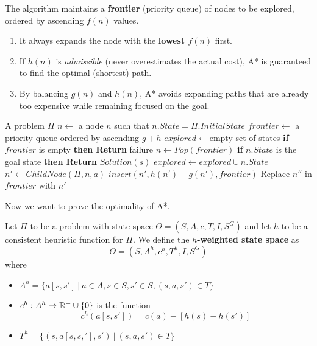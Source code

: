 \documentclass[10pt, letterpaper]{report}
\begin{document}
The algorithm maintains a \textbf{frontier} (priority queue) of nodes to be explored, ordered by ascending $f(n)$ values.
\begin{enumerate}
    \item It always expands the node with the \textbf{lowest $f(n)$} first.
    \item If $h(n)$ is \textit{admissible} (never overestimates the actual cost), A* is guaranteed to find the optimal (shortest) path.
    \item By balancing $g(n)$ and $h(n)$, A* avoids expanding paths that are already too expensive while remaining focused on the goal.
\end{enumerate}
\begin{algorithm}
    \caption{A*}\label{alg:A*}
    \begin{algorithmic}
    \Require A problem $\Pi$
    \State $n\leftarrow$ a node $n$ such that $n.State=\Pi.InitialState$
    \State $frontier\leftarrow$ a priority queue ordered by ascending $g+h$
    \State $explored\leftarrow $empty set of states
    \State \textbf{if} $frontier$ is empty \textbf{then Return} failure 
    \State $n\leftarrow Pop(frontier)$
    \State \textbf{if} $n.State$ is the goal state \textbf{then Return} $Solution(s)$
    \State $explored\leftarrow explored \cup n.State$
    \State $n'\leftarrow ChildNode(\Pi,n,a)$
    \State $insert(n',h(n')+g(n'),frontier)$ 
    \State Replace $n''$ in $frontier$ with $n'$
    \EndIf
    \EndFor
    \EndWhile
    \end{algorithmic}
\end{algorithm}
Now we want to prove the optimality of A*.
\begin{definition}
    Let $\Pi$ to be a problem with state space $\Theta=(S,A,c,T,I,S^G)$ and let $h$ to be a consistent heuristic function for $\Pi$. We define the \textbf{$h$-weighted state space} as $$\Theta=(S,A^h,c^h,T^h,I,S^G)$$
    where\begin{itemize}
        \item $A^h=\{a[s,s'] \ | \ a\in A, s\in S, s'\in S, (s,a,s')\in T  \}$
        \item $c^h:A^h\rightarrow {\mathbb R}^+\cup\{0\}$ is the function $$ 
        c^h(a[s,s'])=c(a)-[h(s)-h(s')]
        $$
        \item $T^h=\{(s,a[s,s,'],s') \ | \ (s,a,s')\in T\}$
    \end{itemize}
\end{definition}
\end{document}
